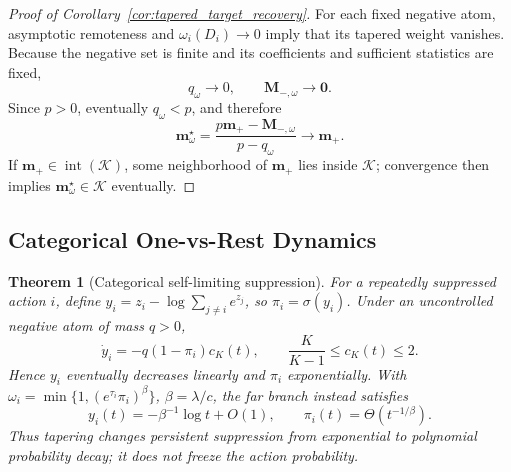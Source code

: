 \documentclass{article}
\theoremstyle{plain}
\newtheorem{theorem}{Theorem}[section]
\theoremstyle{definition}
\theoremstyle{remark}
\begin{document}
\begin{proof}[Proof of Corollary~\ref{cor:tapered_target_recovery}]
For each fixed negative atom, asymptotic remoteness and
\(\omega_i(D_i)\to0\) imply that its tapered weight vanishes. Because the
negative set is finite and its coefficients and sufficient statistics are
fixed,
\[
    q_\omega\longrightarrow0,
    \qquad
    \mathbf M_{-,\omega}\longrightarrow\mathbf0.
\]
Since \(p>0\), eventually \(q_\omega<p\), and therefore
\[
    \mathbf m_\omega^\star
    =
    \frac{p\mathbf m_+-\mathbf M_{-,\omega}}
         {p-q_\omega}
    \longrightarrow
    \mathbf m_+.
\]
If \(\mathbf m_+\in\operatorname{int}(\mathcal K)\), some neighborhood of
\(\mathbf m_+\) lies inside \(\mathcal K\); convergence then implies
\(\mathbf m_\omega^\star\in\mathcal K\) eventually.
\end{proof}

\subsection{Categorical One-vs-Rest Dynamics}
\label{app:categorical_self_limiting}

\begin{theorem}[Categorical self-limiting suppression]
\label{thm:categorical_self_limiting}
For a repeatedly suppressed action \(i\), define
\(y_i=z_i-\log\sum_{j\ne i}e^{z_j}\), so \(\pi_i=\sigma(y_i)\).
Under an uncontrolled negative atom of mass \(q>0\),
\[
\dot y_i=-q(1-\pi_i)c_K(t),
\qquad \frac K{K-1}\le c_K(t)\le2.
\]
Hence \(y_i\) eventually decreases linearly and \(\pi_i\) exponentially.
With \(\omega_i=\min\{1,(e^{\tau_i}\pi_i)^\beta\}\),
\(\beta=\lambda/c\), the far branch instead satisfies
\[
y_i(t)=-\beta^{-1}\log t+O(1),
\qquad \pi_i(t)=\Theta(t^{-1/\beta}).
\]
Thus tapering changes persistent suppression from exponential to
polynomial probability decay; it does not freeze the action probability.
\end{theorem}
\end{document}

